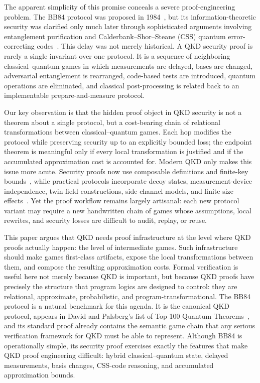 \documentclass[conference,compsoc]{IEEEtran}
\newcommand{\bb}{\textsf{BB84}\xspace}
\begin{document}
The apparent simplicity of this promise conceals a severe proof-engineering problem. The \bb protocol was proposed in 1984~\cite{bb84}, but its information-theoretic security was clarified only much later through sophisticated arguments involving entanglement purification and Calderbank--Shor--Steane (CSS) quantum error-correcting codes~\cite{calderbank1996good,steane1996multiple,lochau1999unconditional,shor2000simple,mayers2001unconditional}. This delay was not merely historical. A QKD security proof is rarely a single invariant over one protocol. It is a sequence of neighboring classical--quantum games in which measurements are delayed, bases are changed, adversarial entanglement is rearranged, code-based tests are introduced, quantum operations are eliminated, and classical post-processing is related back to an implementable prepare-and-measure protocol.

Our key observation is that the hidden proof object in QKD security is not a theorem about a single protocol, but a cost-bearing chain of relational transformations between classical--quantum games. Each hop modifies the protocol while preserving security up to an explicitly bounded loss; the endpoint theorem is meaningful only if every local transformation is justified and if the accumulated approximation cost is accounted for. Modern QKD only makes this issue more acute. Security proofs now use composable definitions and finite-key bounds~\cite{devetak2005distillation,renner2008security,scarani2009security,tomamichel2012tight,xu2020secure}, while practical protocols incorporate decoy states, measurement-device independence, twin-field constructions, side-channel models, and finite-size effects~\cite{lo2005decoy,wang2005beating,lo2012mdi,yin2016mdi,lucamarini2018overcoming,liu2023twinfield}. Yet the proof workflow remains largely artisanal: each new protocol variant may require a new handwritten chain of games whose assumptions, local rewrites, and security losses are difficult to audit, replay, or reuse.

This paper argues that QKD needs proof infrastructure at the level where QKD proofs actually happen: the level of intermediate games. Such infrastructure should make games first-class artifacts, expose the local transformations between them, and compose the resulting approximation costs. Formal verification is useful here not merely because QKD is important, but because QKD proofs have precisely the structure that program logics are designed to control: they are relational, approximate, probabilistic, and program-transformational. The \bb protocol is a natural benchmark for this agenda. It is the canonical QKD protocol, appears in David and Palsberg's list of Top 100 Quantum Theorems~\cite{davidpalsbergtop100}, and its standard proof already contains the semantic game chain that any serious verification framework for QKD must be able to represent. Although \bb is operationally simple, its security proof exercises exactly the features that make QKD proof engineering difficult: hybrid classical--quantum state, delayed measurements, basis changes, CSS-code reasoning, and accumulated approximation bounds.
\end{document}
